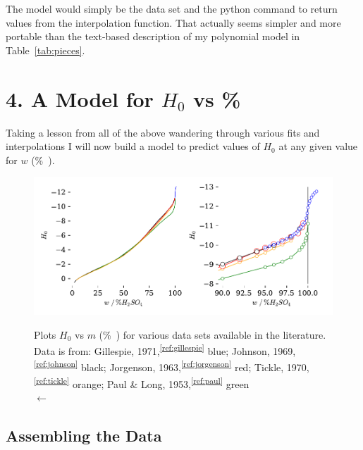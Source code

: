\documentclass[]{tufte-handout}
\newcommand{\tss}[1]{\textsuperscript{#1}}
\begin{document}
The model would simply be the data set and the python command to return values from the interpolation function. That actually seems simpler and more portable than the text-based description of my polynomial model in Table~\vref{tab:pieces}.

\clearpage

\section{4. A Model for $H_0$ vs \%}

Taking a lesson from all of the above wandering through various fits and interpolations I will now build a model to predict values of $H_0$ at any given value for $w$ (\unit{\percent{}}).

\begin{figure}
  \centering
  \caption{Plots $H_0$ vs $m$ (\unit{\percent{}}) for various data sets available in the literature. Data is from: Gillespie, 1971,\tss{\ref{ref:gillespie}} blue; Johnson, 1969,\tss{\ref{ref:johnson}} black; Jorgenson, 1963,\tss{\ref{ref:jorgenson}} red; Tickle, 1970,\tss{\ref{ref:tickle}} orange; Paul \& Long, 1953,\tss{\ref{ref:paul}} green\\ $\longleftarrow$} 
  \hspace*{-10mm}
 \includegraphics[scale=0.75]{images/plot_F1} 
  \label{fig:plot_F1}
\end{figure}
\vspace{-10mm}
\subsection{Assembling the Data}
\end{document}

